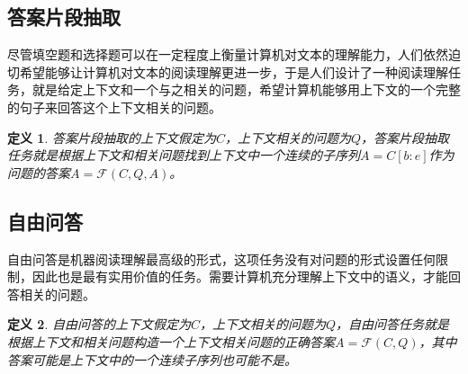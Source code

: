 \documentclass[twoside,a4paper,12pt]{book}%
\newtheorem{definition}{定义}
\begin{document}
\subsection{答案片段抽取}
尽管填空题和选择题可以在一定程度上衡量计算机对文本的理解能力，人们依然迫切希望能够让计算机对文本的阅读理解更进一步，于是人们设计了一种阅读理解任务，就是给定上下文和一个与之相关的问题，希望计算机能够用上下文的一个完整的句子来回答这个上下文相关的问题。
\begin{definition}
答案片段抽取的上下文假定为$C$，上下文相关的问题为$Q$，答案片段抽取任务就是根据上下文和相关问题找到上下文中一个连续的子序列$A=C[b:e]$作为问题的答案$A =\mathcal{F}(C,Q,A)$。
\end{definition}
\subsection{自由问答}
自由问答是机器阅读理解最高级的形式，这项任务没有对问题的形式设置任何限制，因此也是最有实用价值的任务。需要计算机充分理解上下文中的语义，才能回答相关的问题。
\begin{definition}
自由问答的上下文假定为$C$，上下文相关的问题为$Q$，自由问答任务就是根据上下文和相关问题构造一个上下文相关问题的正确答案$A=\mathcal{F}(C,Q)$，其中答案可能是上下文中的一个连续子序列也可能不是。
\end{definition}
\end{document}
